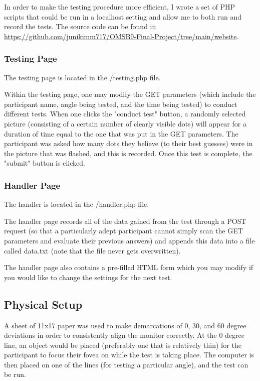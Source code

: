 \documentclass[12pt]{article}
\begin{document}
In order to make the testing procedure more efficient, I wrote a set of PHP
scripts that could be run in a localhost setting and allow me to both run and record the
tests. The source code can be found in
\url{https://github.com/junikimm717/OMSB9-Final-Project/tree/main/website}.

\subsubsection{Testing Page}
The testing page is located in the /testing.php file.

Within the testing page, one may modify the GET parameters (which include the
participant name, angle being tested, and the time being tested) to conduct
different tests. When one clicks the "conduct test" button, a randomly selected
picture (consisting of a certain number of clearly visible dots) will appear
for a duration of time equal to the one that was put in the GET parameters. The
participant was asked how many dots they believe (to their best guesses) were
in the picture that was flashed, and this is recorded. Once this test is
complete, the "submit" button is clicked.

\subsubsection{Handler Page}
The handler is located in the /handler.php file.

The handler page records all of the data gained from the test through a POST
request (so that a particularly adept participant cannot simply scan the GET
parameters and evaluate their previous answers) and appends this data
into a file called data.txt (note that the file never gets overwritten).

The handler page also contains a pre-filled HTML form which you may
modify if you would like to change the settings for the next test.

\subsection{Physical Setup}
A sheet of 11x17 paper was used to make demarcations of 0, 30, and 60 degree
deviations in order to consistently align the monitor correctly. At the 0
degree line, an object would be placed (preferably one that is relatively thin)
for the participant to focus their fovea on while the test is taking place.
The computer is then placed on one of the lines (for testing a particular
angle), and the test can be run.
\end{document}
